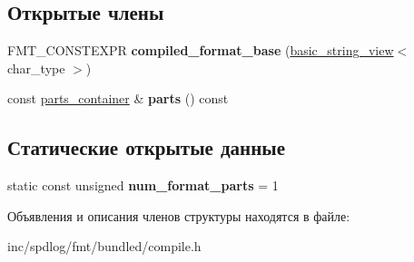 \subsection*{Открытые члены}
\begin{DoxyCompactItemize}
\item 
\mbox{\label{structinternal_1_1compiled__format__base_3_01S_00_01enable__if__t_3_01is__compile__string_3_01S_01_4_1_1value_01_4_01_4_ad8815ade66b70a2835d2929fa35e65d8}} 
F\+M\+T\+\_\+\+C\+O\+N\+S\+T\+E\+X\+PR {\bfseries compiled\+\_\+format\+\_\+base} (\hyperlink{classbasic__string__view}{basic\+\_\+string\+\_\+view}$<$ char\+\_\+type $>$)
\item 
\mbox{\label{structinternal_1_1compiled__format__base_3_01S_00_01enable__if__t_3_01is__compile__string_3_01S_01_4_1_1value_01_4_01_4_aed7f7ce5c93e56cee5c2d3e43de3919d}} 
const \hyperlink{structinternal_1_1format__part}{parts\+\_\+container} \& {\bfseries parts} () const
\end{DoxyCompactItemize}
\subsection*{Статические открытые данные}
\begin{DoxyCompactItemize}
\item 
\mbox{\label{structinternal_1_1compiled__format__base_3_01S_00_01enable__if__t_3_01is__compile__string_3_01S_01_4_1_1value_01_4_01_4_a5c58b72d97494839e5f64cf21c8258b8}} 
static const unsigned {\bfseries num\+\_\+format\+\_\+parts} = 1
\end{DoxyCompactItemize}


Объявления и описания членов структуры находятся в файле\+:\begin{DoxyCompactItemize}
\item 
inc/spdlog/fmt/bundled/compile.\+h\end{DoxyCompactItemize}
